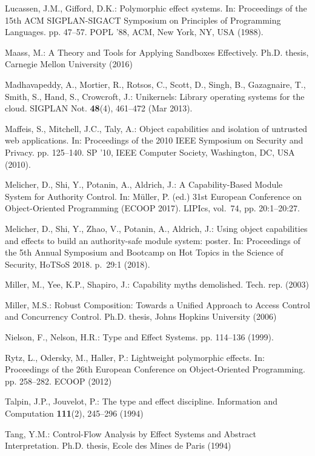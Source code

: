 \documentclass[runningheads]{llncs}
\begin{document}
\begin{thebibliography}{10}
Lucassen, J.M., Gifford, D.K.: Polymorphic effect systems. In: Proceedings of
  the 15th ACM SIGPLAN-SIGACT Symposium on Principles of Programming Languages.
  pp. 47--57. POPL '88, ACM, New York, NY, USA (1988).

Maass, M.: {A Theory and Tools for Applying Sandboxes Effectively}. Ph.D.
  thesis, Carnegie Mellon University (2016)

Madhavapeddy, A., Mortier, R., Rotsos, C., Scott, D., Singh, B., Gazagnaire,
  T., Smith, S., Hand, S., Crowcroft, J.: Unikernels: Library operating systems
  for the cloud. SIGPLAN Not.  \textbf{48}(4),  461--472 (Mar 2013).

Maffeis, S., Mitchell, J.C., Taly, A.: Object capabilities and isolation of
  untrusted web applications. In: Proceedings of the 2010 IEEE Symposium on
  Security and Privacy. pp. 125--140. SP '10, IEEE Computer Society,
  Washington, DC, USA (2010). 

Melicher, D., Shi, Y., Potanin, A., Aldrich, J.: {A Capability-Based Module
  System for Authority Control}. In: M{\"u}ller, P. (ed.) 31st European
  Conference on Object-Oriented Programming (ECOOP 2017). LIPIcs, vol.~74, pp. 20:1--20:27. 
  
Melicher, D., Shi, Y., Zhao, V., Potanin, A., Aldrich, J.: Using object
  capabilities and effects to build an authority-safe module system: poster.
  In: Proceedings of the 5th Annual Symposium and Bootcamp on Hot Topics in the
  Science of Security, HoTSoS 2018. p.~29:1 (2018). 
  
Miller, M., Yee, K.P., Shapiro, J.: Capability myths demolished. Tech. rep.
  (2003)

Miller, M.S.: Robust Composition: Towards a Unified Approach to Access Control
  and Concurrency Control. Ph.D. thesis, Johns Hopkins University (2006)

Nielson, F., Nelson, H.R.: {Type and Effect Systems}. pp. 114--136 (1999).

Rytz, L., Odersky, M., Haller, P.: Lightweight polymorphic effects. In:
  Proceedings of the 26th European Conference on Object-Oriented Programming.
  pp. 258--282. ECOOP (2012)

Talpin, J.P., Jouvelot, P.: The type and effect discipline. Information and
  Computation  \textbf{111}(2),  245--296 (1994)

Tang, Y.M.: Control-Flow Analysis by Effect Systems and Abstract
  Interpretation. Ph.D. thesis, Ecole des Mines de Paris (1994)

\end{thebibliography}
\end{document}
